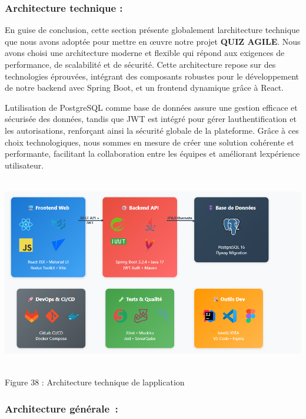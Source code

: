 \documentclass[12pt,a4paper,twoside]{report}
\begin{document}
\hypertarget{architecture-technique}{%
\subsubsection{Architecture technique :}\label{architecture-technique}}

En guise de conclusion, cette section présente globalement
l\textquotesingle architecture technique que nous avons adoptée pour
mettre en œuvre notre projet \textbf{QUIZ AGILE}. Nous avons choisi une
architecture moderne et flexible qui répond aux exigences de
performance, de scalabilité et de sécurité. Cette architecture repose
sur des technologies éprouvées, intégrant des composants robustes pour
le développement de notre backend avec Spring Boot, et un frontend
dynamique grâce à React.

L\textquotesingle utilisation de PostgreSQL comme base de données assure
une gestion efficace et sécurisée des données, tandis que JWT est
intégré pour gérer l\textquotesingle authentification et les
autorisations, renforçant ainsi la sécurité globale de la plateforme.
Grâce à ces choix technologiques, nous sommes en mesure de créer une
solution cohérente et performante, facilitant la collaboration entre les
équipes et améliorant l\textquotesingle expérience utilisateur.

\includegraphics[width=6.03941in,height=3.29328in]{latex_media/media/image44.png}

\protect\hypertarget{_Toc203823448}{}{}Figure 38 : Architecture
technique de l\textquotesingle application

\hypertarget{architecture-guxe9nuxe9rale}{%
\subsubsection{Architecture
générale~:}\label{architecture-guxe9nuxe9rale}}
\end{document}
